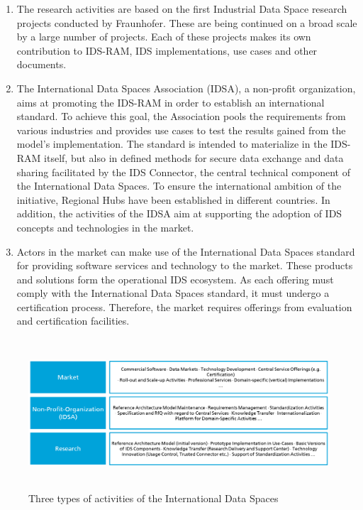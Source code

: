 \begin{enumerate}
	\item The research activities are based on the first Industrial Data Space research projects conducted by Fraunhofer. These are being continued on a broad scale by a large number of projects. Each of these projects makes its own contribution to IDS-RAM, IDS implementations, use cases and other documents.

	\item  The International Data Spaces Association (IDSA), a non-profit organization, aims at promoting the IDS-RAM in order to establish an international standard. To achieve this goal, the Association pools the requirements from various industries and provides use cases to test the results gained from the model’s implementation. The standard is intended to materialize in the IDS-RAM itself, but also in defined methods for secure data exchange and data sharing facilitated by the IDS Connector, the central technical component of the International Data Spaces. To ensure the international ambition of the initiative, Regional Hubs have been established in different countries. In addition, the activities of the IDSA aim at supporting the adoption of IDS concepts and technologies in the market. 

	\item Actors in the market can make use of the International Data Spaces standard for providing software services and technology to the market. These products and solutions form the operational IDS ecosystem. As each offering must comply with the International Data Spaces standard, it must undergo a certification process. Therefore, the market requires offerings from evaluation and certification facilities.
\end{enumerate}




\begin{figure}[H]
	\begin{Center}
		\includegraphics[width=6.35in,height=2.2in]{./media/image10.png}
		\caption{ Three types of activities of the International Data Spaces}
		\label{fig:_Three_types_of_activities_of_the_International_Data_Spaces}
	\end{Center}
\end{figure}



